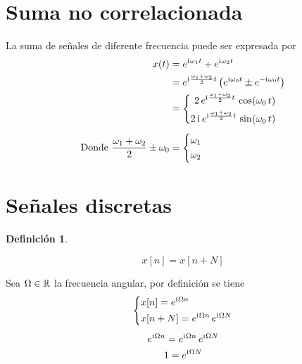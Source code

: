 \documentclass[a5paper,12pt,twoside]{book}
\newtheorem{defn}{{Definición}}[chapter]
\begin{document}
\section{Suma no correlacionada}

La suma de señales de diferente frecuencia puede ser expresada por
\begin{align*}
    \fx[x]{t} &= e^{\iu \omega_1 t} + e^{\iu \omega_2 t}
    \\
    &= e^{\iu \frac{\omega_1 + \omega_2}{2} t} \left( e^{\iu \omega_0 t} \pm e^{-\iu \omega_0 t} \right)
    \\
    &= \left\{
    \begin{aligned}
        2 \, e^{\iu \frac{\omega_1 + \omega_2}{2} t} \, \fx[\cos]{\omega_0 \, t}
        \\
        2 \, \iu \, e^{\iu \frac{\omega_1 + \omega_2}{2} t} \, \fx[\sin]{\omega_0 \, t}
    \end{aligned}
    \right.
    \\[1ex]
    \text{Donde } \frac{\omega_1+\omega_2}{2} \pm \omega_0 &=
    \left\{
    \begin{aligned}
        & \omega_1
        \\
        & \omega_2
    \end{aligned}
    \right.
\end{align*}


\section{Señales discretas}

\begin{mdframed}[style=MyFrame1]
    \begin{defn}
        \label{defn:funcDiscPeriod}
    \end{defn}
    \begin{equation*}
        x[n] = x[n+N]
    \end{equation*}
\end{mdframed}

Sea $\Omega \in \setR$ la frecuencia angular, por definición se tiene
\begin{gather*}
    \left\{
    \begin{aligned}
        & x[n] = e^{\iu \Omega n}
        \\
        & x[n+N] = e^{\iu \Omega n} \, e^{\iu \Omega N}
    \end{aligned}
    \right.
    \\[1ex]
    e^{\iu \Omega n} = e^{\iu \Omega n} \, e^{\iu \Omega N}
    \\
    1 = e^{\iu \Omega N}
\end{gather*}
\end{document}
